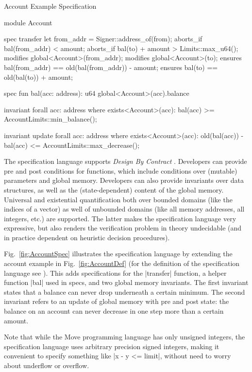 \begin{Figure}
\caption{\label{fig:AccountSpec} Account Example Specification}
\begin{MoveBox}
module Account {
  spec transfer {
    let from_addr = Signer::address_of(from);
    aborts_if bal(from_addr) < amount;
    aborts_if bal(to) + amount > Limits::max_u64();
    modifies global<Account>(from_addr);
    modifies global<Account>(to);
    ensures bal(from_addr) == old(bal(from_addr)) - amount;
    ensures bal(to) == old(bal(to)) + amount;
  }

  spec fun bal(acc: address): u64 {
    global<Account>(acc).balance
  }

  invariant forall acc: address where exists<Account>(acc):
    bal(acc) >= AccountLimits::min_balance();

  invariant update forall acc: address where exists<Account>(acc):
    old(bal(acc)) - bal(acc) <= AccountLimits::max_decrease();
}
\end{MoveBox}
\end{Figure}

\noindent The specification language supports {\em Design By Contract}
\cite{DESIGN_BY_CONTRACT}. Developers can provide pre and post conditions for
functions, which include conditions over (mutable) parameters and global
memory. Developers can also provide invariants over data structures, as well as
the (state-dependent) content of the global memory. Universal and existential
quantification both over bounded domains (like the indices of a vector) as well
of unbounded domains (like all memory addresses, all integers, etc.)  are
supported. The latter makes the specification language very expressive, but also
renders the verification problem in theory undecidable (and in practice
dependent on heuristic decision procedures).

Fig.~\ref{fig:AccountSpec} illustrates the specification language by extending
the account example in Fig.~\ref{fig:AccountDef} (for the definition of the
specification language see \cite{MOVE_SPEC_LANG_DEF}). This adds specifications
for the |transfer| function, a helper function |bal| used in specs, and two
global memory invariants. The first invariant states that a balance can never
drop underneath a certain minimum. The second invariant refers to an update of
global memory with pre and post state: the balance on an account can never
decrease in one step more than a certain amount.

Note that while the Move programming language has only unsigned integers, the
specification language uses arbitrary precision signed integers, making it
convenient to specify something like |x - y <= limit|, without need to worry
about underflow or overflow.

